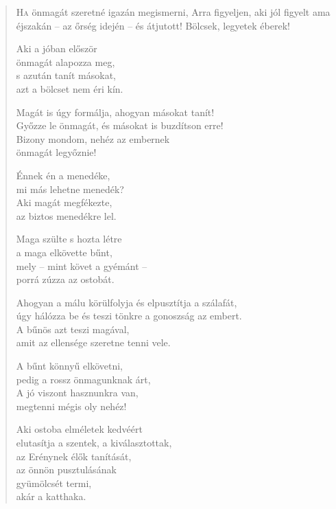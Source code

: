 
\begin{verse}

{\par%
\lettrine{H}{a} {\LettrineTextFont önmagát szeretné igazán megismerni,}\newline
Arra figyeljen, aki jól figyelt\newline
ama éjszakán – az őrség idején – és átjutott!\verselinebreak
Bölcsek, legyetek éberek!
\par}

 Aki a jóban először\\
önmagát alapozza meg,\\
s azután tanít másokat,\\
azt a bölcset nem éri kín.

 Magát is úgy formálja, ahogyan másokat tanít!\\
Győzze le önmagát, és másokat is buzdítson erre!\\
Bizony mondom, nehéz az embernek\\
önmagát legyőznie!

 Énnek én a menedéke,\\
mi más lehetne menedék?\\
Aki magát megfékezte,\\
az biztos menedékre lel.

 Maga szülte s hozta létre\\
a maga elkövette bűnt,\\
mely – mint követ a gyémánt –\\
porrá zúzza az ostobát.

 Ahogyan a málu körülfolyja és elpusztítja a szálafát,\\
úgy hálózza be és teszi tönkre a gonoszság az embert.\\
A bűnös azt teszi magával,\\
amit az ellensége szeretne tenni vele.

 A bűnt könnyű elkövetni,\\
pedig a rossz önmagunknak árt,\\
A jó viszont hasznunkra van,\\
megtenni mégis oly nehéz!

 Aki ostoba elméletek kedvéért\\
elutasítja a szentek, a kiválasztottak,\\
az Erénynek élők tanítását,\\
az önnön pusztulásának\\
gyümölcsét termi,\\
akár a katthaka.


\end{verse}
